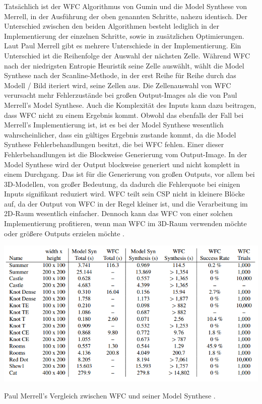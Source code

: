 \documentclass[12pt, a4paper,twoside,openany]{report} %
\begin{document}
Tatsächlich ist der WFC Algorithmus von Gumin und die Model Synthese von Merrell, in der Ausführung der oben genannten Schritte, nahezu identisch.
Der Unterschied zwischen den beiden Algorithmen besteht lediglich in der Implementierung der einzelnen Schritte, sowie in zusätzlichen Optimierungen.
Laut Paul Merrell gibt es mehrere Unterschiede in der Implementierung.
Ein Unterschied ist die Reihenfolge der Auswahl der nächsten Zelle.
Während WFC nach der niedrigsten Entropie Heuristik seine Zelle auswählt,
wählt die Model Synthese nach der Scanline-Methode, in der erst Reihe für Reihe durch das Modell / Bild iteriert wird, seine Zellen aus.
Die Zellenauswahl von WFC verursacht mehr Fehlerzustände bei großen Output-Images als die von Paul Merrell's Model Synthese.
Auch die Komplexität des Inputs kann dazu beitragen, dass WFC nicht zu einem Ergebnis kommt.
Obwohl das ebenfalls der Fall bei Merrell's Implementierung ist, ist es bei der Model Synthese wesentlich wahrscheinlicher, dass ein gültiges Ergebnis zustande kommt,
da die Model Synthese Fehlerbehandlungen besitzt, die bei WFC fehlen.
\newline
Einer dieser Fehlerbehandlungen ist die Blockweise Generierung vom Output-Image.
In der Model Synthese wird der Output blockweise generiert und nicht komplett in einem Durchgang.
Das ist für die Generierung von großen Outputs, vor allem bei 3D-Modellen, von großer Bedeutung, da dadurch die Fehlerquote bei einigen Inputs signifikant reduziert wird.
WFC teilt sein CSP nicht in kleinere Blöcke auf, da der Output von WFC in der Regel kleiner ist, und die Verarbeitung im 2D-Raum wesentlich einfacher.
Dennoch kann das WFC von einer solchen Implementierung profitieren, wenn man WFC im 3D-Raum verwenden möchte oder größere Outputs erzielen möchte \cite{merrell2018compare}.

\begin{table}[H]
    \centering
    \includegraphics[width=1\linewidth]{images/timing-and-success-comparison.png}%
    \caption{Paul Merrell's Vergleich zwischen WFC und seiner Model Synthese \cite{merrell2018compare}.}%
\end{table}
\end{document}
